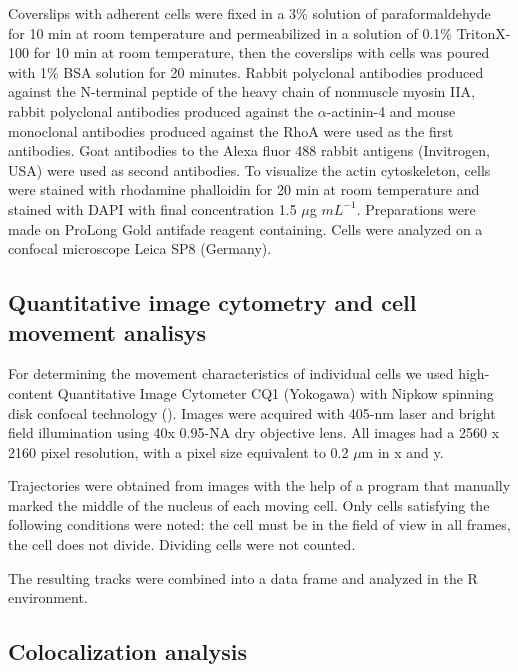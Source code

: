 \documentclass[english,authoryear]{elsarticle}
\begin{document}
Coverslips with adherent cells were fixed in a 3\% solution of paraformaldehyde for 10 min at room temperature and permeabilized in a solution of 0.1\% TritonX-100 for 10 min at room temperature, then the coverslips with cells was poured with 1\% BSA solution for 20 minutes.
Rabbit polyclonal antibodies produced against the N-terminal peptide of the heavy chain of nonmuscle myosin IIA, rabbit polyclonal antibodies produced against the $\alpha$-actinin-4 and mouse monoclonal antibodies produced against the RhoA were used as the first antibodies. Goat antibodies to the Alexa fluor 488 rabbit antigens (Invitrogen, USA) were used as second antibodies. To visualize the actin cytoskeleton, cells were stained with rhodamine phalloidin for 20 min at room temperature and stained with DAPI with final concentration 1.5 $\mu$g $mL^{−1}$. Preparations were made on ProLong Gold antifade reagent containing. Cells were analyzed on a confocal microscope Leica SP8 (Germany).

\subsection{Quantitative image cytometry and cell movement analisys}

For determining the movement characteristics of individual cells we used high-content Quantitative Image Cytometer CQ1 (Yokogawa) with Nipkow spinning disk confocal technology (\cite{sakashita2015cq1}).
Images were acquired with 405-nm laser and bright field illumination using 40x 0.95-NA dry objective lens. All images had a 2560 x 2160 pixel resolution, with a pixel size equivalent to 0.2 $\mu$m in x and y.

Trajectories were obtained from images with the help of a program that manually marked the middle of the nucleus of each moving cell. Only cells satisfying the following conditions were noted: the cell must be in the field of view in all frames, the cell does not divide. Dividing cells were not counted.

The resulting tracks were combined into a data frame and analyzed in the R environment.

\subsection{Colocalization analysis}
\end{document}
